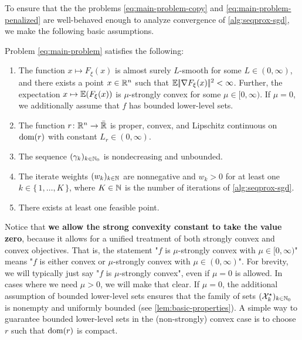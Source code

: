 To ensure
that the the problems \eqref{eq:main-problem-copy} and \eqref{eq:main-problem-penalized}
are well-behaved enough to analyze convergence
of \cref{alg:seqprox-sgd}, we make the following basic assumptions.
\begin{assumption}
    \label{ass:basic-assumptions}
    Problem \eqref{eq:main-problem} satisfies the following:
    \begin{enumerate}
        \item The function $x\mapsto F_\xi(x)$ is almost surely $L$-smooth for some $L\in(0,\infty)$,
            and there exists a point $x\in\mathbb{R}^n$ such that $\mathbb{E}|\!|\nabla F_\xi(x)|\!|^2 < \infty$.
            Further, the expectation $x\mapsto \mathbb{E}(F_\xi(x))$ is $\mu$-strongly convex for some
            $\mu\in[0, \infty)$.
            If $\mu = 0$, we additionally assume that $f$ has bounded lower-level sets.
        \item The function $r\colon\mathbb{R}^n\to\bar{\mathbb{R}}$ is proper, convex, and
        Lipschitz continuous on $\operatorname{dom}(r)$ with constant $L_r\in(0,\infty)$.
        \item The sequence $(\gamma_k)_{k\in\mathbb{N}_0}$ is nondecreasing and unbounded.
        \item The iterate weights $(w_k)_{k\in\mathbb{N}}$ are nonnegative and $w_k > 0$ for at least
            one $k\in\{\,1,\dots, K\,\}$, where $K\in\mathbb{N}$ is the number of iterations of \cref{alg:seqprox-sgd}.
        \item There exists at least one feasible point.
    \end{enumerate}
\end{assumption}

Notice that \textbf{we allow the strong convexity constant to take the value zero},
because it allows for a unified treatment of both strongly convex and convex
objectives.
That is, the statement "$f$ is $\mu$-strongly convex with $\mu\in[0, \infty)$"
means "$f$ is either convex or $\mu$-strongly convex with $\mu\in(0, \infty)$".
For brevity, we will typically just say "$f$ is $\mu$-strongly convex", even
if $\mu = 0$ is allowed. In cases
where we need $\mu > 0$, we will make that clear.
If $\mu = 0$, the additional assumption of bounded lower-level sets
ensures that the family of sets $(\mathcal{X}_k^\star)_{k\in\mathbb{N}_0}$
is nonempty and uniformly bounded (see \cref{lem:basic-properties}).
A simple way to guarantee bounded lower-level sets in the
(non-strongly) convex case is to choose $r$ such that $\operatorname{dom}(r)$
is compact.

